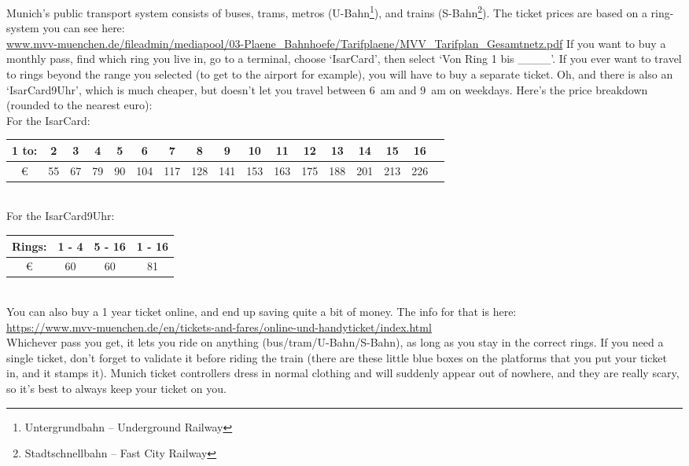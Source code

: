 \documentclass[11pt]{report}
\begin{document}
Munich's public transport system consists of buses, trams, metros (U-Bahn\footnote{Untergrundbahn -- Underground Railway}), and trains (S-Bahn\footnote{Stadtschnellbahn -- Fast City Railway}). The ticket prices are based on a ring-system you can see here:\\ \href{https://www.mvv-muenchen.de/fileadmin/mediapool/03-Plaene_Bahnhoefe/Tarifplaene/MVV_Tarifplan_Gesamtnetz.pdf}{\tiny www.mvv-muenchen.de/fileadmin/mediapool/03-Plaene\_Bahnhoefe/Tarifplaene/MVV\_Tarifplan\_Gesamtnetz.pdf}
If you want to buy a monthly pass, find which ring you live in, go to a terminal, choose `IsarCard', then select `Von Ring 1 bis \_\_\_\_'. If you ever want to travel to rings beyond the range you selected (to get to the airport for example), you will have to buy a separate ticket. Oh, and there is also an `IsarCard9Uhr', which is much cheaper, but doesn't let you travel between 6~am and 9~am on weekdays. Here's the price breakdown (rounded to the nearest euro):\\

\noindent For the IsarCard:\\
{\tiny \noindent
\begin{tabular}{c||c|c|c|c|c|c|c|c|c|c|c|c|c|c|c|c|}
1 to: & 2 & 3 & 4 & 5 & 6 & 7 & 8 & 9 & 10 & 11 & 12 & 13 & 14 & 15 & 16\\
\hline
\euro{} & 55 & 67 & 79 & 90 & 104 & 117 & 128 & 141 & 153 & 163 & 175 & 188 & 201 & 213 & 226\\
\end{tabular}
}\\

\noindent For the IsarCard9Uhr:\\
{\tiny \noindent
\begin{tabular}{c||c|c|c|}
Rings: & 1 - 4  &  5 -  16 & 1 - 16 \\
\hline
\euro{} & 60 & 60 & 81 \\
\end{tabular}
}\\

You can also buy a 1 year ticket online, and end up saving quite a bit of money. The info for that is here:\\
\href{https://www.mvv-muenchen.de/en/tickets-and-fares/online-und-handyticket/index.html}{\scriptsize https://www.mvv-muenchen.de/en/tickets-and-fares/online-und-handyticket/index.html}\\

Whichever pass you get, it lets you ride on anything (bus/tram/U-Bahn/S-Bahn), as long as you stay in the correct rings. If you need a single ticket, don't forget to validate it before riding the train (there are these little blue boxes on the platforms that you put your ticket in, and it stamps it). Munich ticket controllers dress in normal clothing and will suddenly appear out of nowhere, and they are really scary, so it's best to always keep your ticket on you.
\end{document}
